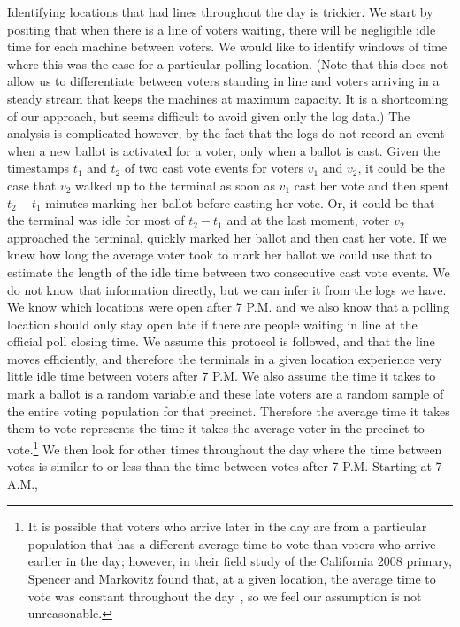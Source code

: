 \documentclass[letterpaper,twocolumn,10pt]{article}
\begin{document}
Identifying locations that had lines throughout the day is trickier. We start by
positing that when there is a line of voters waiting, there will be negligible
idle time for each machine between voters. We would like to identify windows of
time where this was the case for a particular polling location. (Note that this
does not allow us to differentiate between voters standing in line and voters
arriving in a steady stream that keeps the machines at maximum capacity. It is a
shortcoming of our approach, but seems difficult to avoid given only the log
data.) The analysis is complicated however, by the fact that the logs do not
record an event when a new ballot is activated for a voter, only when a ballot
is cast. Given the timestamps $t_1$ and $t_2$ of two cast vote events for voters
$v_1$ and $v_2$, it could be the case that $v_2$ walked up to the terminal
as soon as $v_1$ cast her vote and then spent $t_2-t_1$ minutes marking her
ballot before casting her vote. Or, it could be that the terminal was idle for
most of $t_2-t_1$ and at the last moment, voter $v_2$ approached the terminal,
quickly marked her ballot and then cast her vote. If we knew how long the
average voter took to mark her ballot we could use that to estimate the length
of the idle time between two consecutive cast vote events. We do not know that
information directly, but we can infer it from the logs we have. We know which
locations were open after 7 P.M. and we also know that a polling location should
only stay open late if there are people waiting in line at the official poll
closing time. We assume this protocol is followed, and that
the line moves efficiently, and therefore the terminals in a given location
experience very little idle time between voters after 7 P.M. We also assume
the time it takes to mark a ballot is a random variable and these late voters
are a random sample of the entire voting population for that precinct. Therefore
the average time it takes them to vote represents the time it takes the average
voter in the precinct to vote.\footnote{It is possible that voters who arrive later in
the day are from a particular population that has a different average
time-to-vote than voters who arrive earlier in the day; however, in their field
study of the California 2008 primary, Spencer and Markovitz found that, at a
given location, the
average time to vote was constant throughout the day~\cite{Spencer2010}, so we
feel our assumption is not unreasonable.} We 
then look for other times throughout the day where the time between votes is
similar to or less than the time between votes after 7 P.M. Starting at 7 A.M.,
\end{document}
